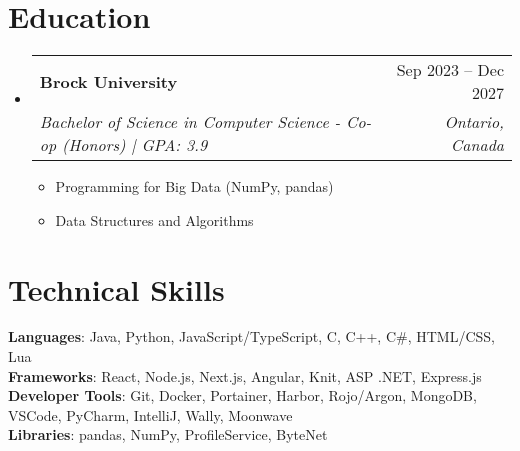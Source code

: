 \documentclass[letterpaper,11pt]{article}
\makeatletter
\newcommand{\resumeItem}[1]{
  \item\small{
    {#1 \vspace{-2pt}}
  }
}
\newcommand{\resumeSubheading}[4]{
  \vspace{-2pt}\item
    \begin{tabular*}{0.97\textwidth}[t]{l@{\extracolsep{\fill}}r}
      \textbf{#1} & #2 \\
      \textit{\small#3} & \textit{\small #4} \\
    \end{tabular*}\vspace{-7pt}
}
\newcommand{\resumeSubHeadingListStart}{\begin{itemize}[leftmargin=0.15in, label={}]}
\newcommand{\resumeSubHeadingListEnd}{\end{itemize}}
\newcommand{\resumeItemListStart}{\begin{itemize}}
\newcommand{\resumeItemListEnd}{\end{itemize}\vspace{-5pt}}
\makeatother
\begin{document}
\section{Education}
  \resumeSubHeadingListStart
    \resumeSubheading
      {Brock University}{Sep 2023 -- Dec 2027}
      {Bachelor of Science in Computer Science - Co-op (Honors) | GPA: 3.9}{Ontario, Canada}
    \resumeItemListStart
      \resumeItem{Programming for Big Data (NumPy, pandas)}
      \resumeItem{Data Structures and Algorithms}
    \resumeItemListEnd
  \resumeSubHeadingListEnd
%

\section{Technical Skills}
 \begin{itemize}[leftmargin=0.15in, label={}]
    \small{\item{
     \textbf{Languages}{: Java, Python, JavaScript/TypeScript, C, C++, C\#, HTML/CSS, Lua} \\
     \textbf{Frameworks}{: React, Node.js, Next.js, Angular, Knit, ASP .NET, Express.js} \\
     \textbf{Developer Tools}{: Git, Docker, Portainer, Harbor, Rojo/Argon, MongoDB, VSCode, PyCharm, IntelliJ, Wally, Moonwave} \\
     \textbf{Libraries}{: pandas, NumPy, ProfileService, ByteNet}
    }}
 \end{itemize}
%
\end{document}
